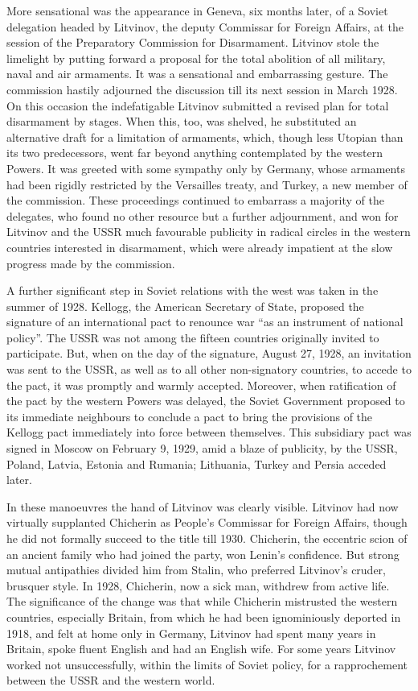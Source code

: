 More sensational was the appearance in Geneva, six months later, of a Soviet delegation headed by Litvinov, the deputy Commissar for Foreign Affairs, at the session of the Preparatory Commission for Disarmament.  Litvinov stole the limelight by putting forward a proposal for the total abolition of all military, naval and air armaments. It was a sensational and embarrassing gesture. The commission hastily adjourned the discussion till its next session in March 1928. On this occasion the indefatigable Litvinov submitted a revised plan for total disarmament by stages. When this, too, was shelved, he substituted an alternative draft for a limitation of armaments, which, though less Utopian than its two predecessors, went far beyond anything contemplated by the western Powers. It was greeted with some sympathy only by Germany, whose armaments had been rigidly restricted by the Versailles treaty, and Turkey, a new member of the commission. These proceedings continued to embarrass a majority of the delegates, who found no other resource but a further adjournment, and won for Litvinov and the USSR much favourable publicity in radical circles in the western countries interested in disarmament, which were already impatient at the slow progress made by the commission. 

A further significant step in Soviet relations with the west was taken in the summer of 1928. Kellogg, the American Secretary of State, proposed the signature of an international pact to renounce war ``as an instrument of national policy''. The USSR was not among the fifteen countries originally invited to participate. But, when on the day of the signature, August 27, 1928, an invitation was sent to the USSR, as well as to all other non-signatory countries, to accede to the pact, it was promptly and warmly accepted.  Moreover, when ratification of the pact by the western Powers was delayed, the Soviet Government proposed to its immediate neighbours to conclude a pact to bring the provisions of the Kellogg pact immediately into force between themselves. This subsidiary pact was signed in Moscow on February 9, 1929, amid a blaze of publicity, by the USSR, Poland, Latvia, Estonia and Rumania; Lithuania, Turkey and Persia acceded later. 

In these manoeuvres the hand of Litvinov was clearly visible. Litvinov had now virtually supplanted Chicherin as People's Commissar for Foreign Affairs, though he did not formally succeed to the title till 1930. Chicherin, the eccentric scion of an ancient family who had joined the party, won Lenin's confidence. But strong mutual antipathies divided him from Stalin, who preferred Litvinov's cruder, brusquer style. In 1928, Chicherin, now a sick man, withdrew from active life. The significance of the change was that while Chicherin mistrusted the western countries, especially Britain, from which he had been ignominiously deported in 1918, and felt at home only in Germany, Litvinov had spent many years in Britain, spoke fluent English and had an English wife. For some years Litvinov worked not unsuccessfully, within the limits of Soviet policy, for a rapprochement between the USSR and the western world. 

